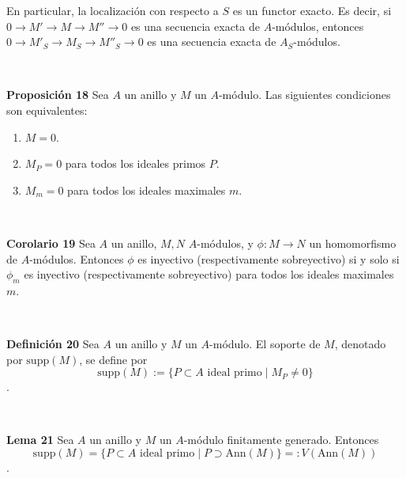 \documentclass[10pt,a4paper]{article}
\begin{document}
\begin{enumerate}[label=(\alph*)]
En particular, la localización con respecto a \( S \) es un functor exacto. Es decir, si \( 0 \rightarrow M' \rightarrow M \rightarrow M'' \rightarrow 0 \) es una secuencia exacta de \( A \)-módulos, entonces \( 0 \rightarrow M'_S \rightarrow M_S \rightarrow M''_S \rightarrow 0 \) es una secuencia exacta de \( A_S \)-módulos.

\

\textbf{Proposición 18}
Sea \( A \) un anillo y \( M \) un \( A \)-módulo. Las siguientes condiciones son equivalentes:
\begin{enumerate}
    \item \( M = 0 \).
    \item \( M_P = 0 \) para todos los ideales primos \( P \).
    \item \( M_m = 0 \) para todos los ideales maximales \( m \).
\end{enumerate}

\

\textbf{Corolario 19}
Sea \( A \) un anillo, \( M, N \) \( A \)-módulos, y \( \phi: M \rightarrow N \) un homomorfismo de \( A \)-módulos. Entonces \( \phi \) es inyectivo (respectivamente sobreyectivo) si y solo si \( \phi_m \) es inyectivo (respectivamente sobreyectivo) para todos los ideales maximales \( m \).

\ 

\textbf{Definición 20}
Sea \( A \) un anillo y \( M \) un \( A \)-módulo. El soporte de \( M \), denotado por \( \text{supp}(M) \), se define por
\[ \text{supp}(M) := \{ P \subset A \text{ ideal primo} \mid M_P \neq 0 \} \].

\

\textbf{Lema 21}
Sea \( A \) un anillo y \( M \) un \( A \)-módulo finitamente generado. Entonces
\[ \text{supp}(M) = \{ P \subset A \text{ ideal primo} \mid P \supset \text{Ann}(M) \} =: V(\text{Ann}(M)) \].


	\end{enumerate}
\end{document}
